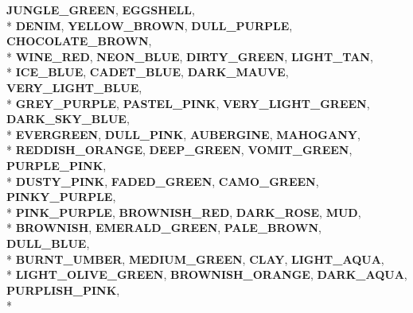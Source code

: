\begin{DoxyCompactItemize}
{\bfseries J\+U\+N\+G\+L\+E\+\_\+\+G\+R\+E\+EN}, 
{\bfseries E\+G\+G\+S\+H\+E\+LL}, 
\\*
{\bfseries D\+E\+N\+IM}, 
{\bfseries Y\+E\+L\+L\+O\+W\+\_\+\+B\+R\+O\+WN}, 
{\bfseries D\+U\+L\+L\+\_\+\+P\+U\+R\+P\+LE}, 
{\bfseries C\+H\+O\+C\+O\+L\+A\+T\+E\+\_\+\+B\+R\+O\+WN}, 
\\*
{\bfseries W\+I\+N\+E\+\_\+\+R\+ED}, 
{\bfseries N\+E\+O\+N\+\_\+\+B\+L\+UE}, 
{\bfseries D\+I\+R\+T\+Y\+\_\+\+G\+R\+E\+EN}, 
{\bfseries L\+I\+G\+H\+T\+\_\+\+T\+AN}, 
\\*
{\bfseries I\+C\+E\+\_\+\+B\+L\+UE}, 
{\bfseries C\+A\+D\+E\+T\+\_\+\+B\+L\+UE}, 
{\bfseries D\+A\+R\+K\+\_\+\+M\+A\+U\+VE}, 
{\bfseries V\+E\+R\+Y\+\_\+\+L\+I\+G\+H\+T\+\_\+\+B\+L\+UE}, 
\\*
{\bfseries G\+R\+E\+Y\+\_\+\+P\+U\+R\+P\+LE}, 
{\bfseries P\+A\+S\+T\+E\+L\+\_\+\+P\+I\+NK}, 
{\bfseries V\+E\+R\+Y\+\_\+\+L\+I\+G\+H\+T\+\_\+\+G\+R\+E\+EN}, 
{\bfseries D\+A\+R\+K\+\_\+\+S\+K\+Y\+\_\+\+B\+L\+UE}, 
\\*
{\bfseries E\+V\+E\+R\+G\+R\+E\+EN}, 
{\bfseries D\+U\+L\+L\+\_\+\+P\+I\+NK}, 
{\bfseries A\+U\+B\+E\+R\+G\+I\+NE}, 
{\bfseries M\+A\+H\+O\+G\+A\+NY}, 
\\*
{\bfseries R\+E\+D\+D\+I\+S\+H\+\_\+\+O\+R\+A\+N\+GE}, 
{\bfseries D\+E\+E\+P\+\_\+\+G\+R\+E\+EN}, 
{\bfseries V\+O\+M\+I\+T\+\_\+\+G\+R\+E\+EN}, 
{\bfseries P\+U\+R\+P\+L\+E\+\_\+\+P\+I\+NK}, 
\\*
{\bfseries D\+U\+S\+T\+Y\+\_\+\+P\+I\+NK}, 
{\bfseries F\+A\+D\+E\+D\+\_\+\+G\+R\+E\+EN}, 
{\bfseries C\+A\+M\+O\+\_\+\+G\+R\+E\+EN}, 
{\bfseries P\+I\+N\+K\+Y\+\_\+\+P\+U\+R\+P\+LE}, 
\\*
{\bfseries P\+I\+N\+K\+\_\+\+P\+U\+R\+P\+LE}, 
{\bfseries B\+R\+O\+W\+N\+I\+S\+H\+\_\+\+R\+ED}, 
{\bfseries D\+A\+R\+K\+\_\+\+R\+O\+SE}, 
{\bfseries M\+UD}, 
\\*
{\bfseries B\+R\+O\+W\+N\+I\+SH}, 
{\bfseries E\+M\+E\+R\+A\+L\+D\+\_\+\+G\+R\+E\+EN}, 
{\bfseries P\+A\+L\+E\+\_\+\+B\+R\+O\+WN}, 
{\bfseries D\+U\+L\+L\+\_\+\+B\+L\+UE}, 
\\*
{\bfseries B\+U\+R\+N\+T\+\_\+\+U\+M\+B\+ER}, 
{\bfseries M\+E\+D\+I\+U\+M\+\_\+\+G\+R\+E\+EN}, 
{\bfseries C\+L\+AY}, 
{\bfseries L\+I\+G\+H\+T\+\_\+\+A\+Q\+UA}, 
\\*
{\bfseries L\+I\+G\+H\+T\+\_\+\+O\+L\+I\+V\+E\+\_\+\+G\+R\+E\+EN}, 
{\bfseries B\+R\+O\+W\+N\+I\+S\+H\+\_\+\+O\+R\+A\+N\+GE}, 
{\bfseries D\+A\+R\+K\+\_\+\+A\+Q\+UA}, 
{\bfseries P\+U\+R\+P\+L\+I\+S\+H\+\_\+\+P\+I\+NK}, 
\\*

\end{DoxyCompactItemize}
